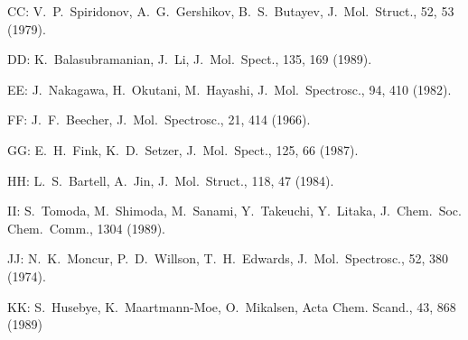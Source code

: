 \begin{description}
\item{  CC: } V.\ P.\ Spiridonov, A.\ G.\ Gershikov, B.\ S.\ Butayev,
       J.\ Mol.\ Struct., 52, 53 (1979).
  
\item{  DD: } K.\ Balasubramanian, J.\ Li, J.\ Mol.\ Spect., 135, 169 (1989).
  
\item{  EE: } J.\ Nakagawa, H.\ Okutani, M.\ Hayashi, J.\ Mol.\ Spectrosc., 94, 410 (1982).
  
\item{  FF: } J.\ F.\ Beecher, J.\ Mol.\ Spectrosc., 21, 414 (1966).
  
\item{  GG: } E.\ H.\ Fink, K.\ D.\ Setzer, J.\ Mol.\ Spect., 125, 66 (1987).
  
\item{  HH: } L.\ S.\ Bartell, A.\ Jin, J.\ Mol.\ Struct., 118, 47 (1984).
  
\item{  II: } S.\ Tomoda, M.\ Shimoda, M.\ Sanami, Y.\ Takeuchi, Y.\ Litaka, J.\ Chem.\ Soc.
       Chem.\ Comm., 1304 (1989).
  
\item{  JJ: } N.\ K.\ Moncur, P.\ D.\ Willson, T.\ H.\ Edwards, J.\ Mol.\ Spectrosc., 52,
       380 (1974).
  
\item{  KK: } S.\ Husebye, K.\ Maartmann-Moe, O.\ Mikalsen, Acta Chem. Scand., 43, 868 (1989)
\end{description}
